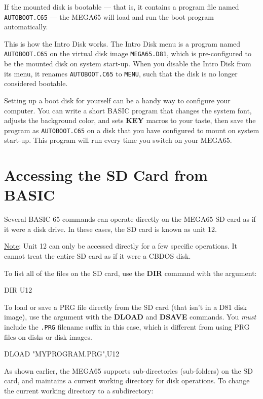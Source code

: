 If the mounted disk is bootable --- that is, it contains a program file named {\tt AUTOBOOT.C65} --- the MEGA65 will load and run the boot program automatically.

This is how the Intro Disk works. The Intro Disk menu is a program named {\tt AUTOBOOT.C65} on the virtual disk image {\tt MEGA65.D81}, which is pre-configured to be the mounted disk on system start-up. When you disable the Intro Disk from its menu, it renames {\tt AUTOBOOT.C65} to {\tt MENU}, such that the disk is no longer considered bootable.

Setting up a boot disk for yourself can be a handy way to configure your computer. You can write a short BASIC program that changes the system font, adjusts the background color, and sets {\bf KEY} macros to your taste, then save the program as {\tt AUTOBOOT.C65} on a disk that you have configured to mount on system start-up. This program will run every time you switch on your MEGA65.


\section{Accessing the SD Card from BASIC}

Several BASIC 65 commands can operate directly on the MEGA65 SD card as if it were a disk drive. In these cases, the SD card is known as unit 12.

\underline{Note}: Unit 12 can only be accessed directly for a few specific operations. It cannot treat the entire SD card as if it were a CBDOS disk.

To list all of the files on the SD card, use the {\bf DIR} command with the  argument:

\begin{screenoutput}
DIR U12
\end{screenoutput}

To load or save a PRG file directly from the SD card (that isn't in a D81 disk image), use the  argument with the {\bf DLOAD} and {\bf DSAVE} commands. You {\em must} include the {\tt .PRG} filename suffix in this case, which is different from using PRG files on disks or disk images.

\begin{screenoutput}
DLOAD "MYPROGRAM.PRG",U12
\end{screenoutput}

As shown earlier, the MEGA65 supports sub-directories (sub-folders) on the SD card, and maintains a current working directory for disk operations. To change the current working directory to a subdirectory:

